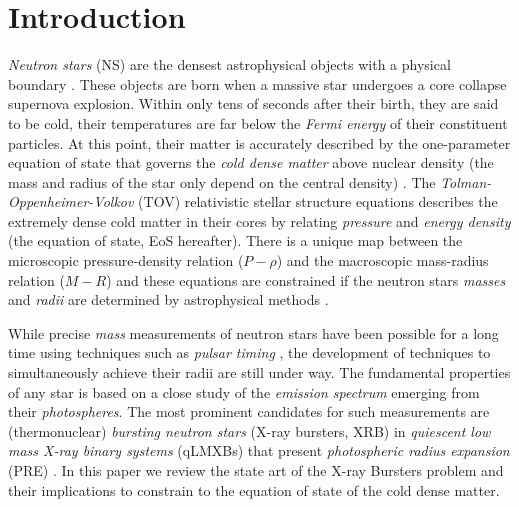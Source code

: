 
\section{Introduction}


{\it Neutron stars} (NS)  are the densest astrophysical objects
with a physical boundary \cite{THORN}. These objects are born when a massive star undergoes a core collapse supernova explosion. Within only tens of seconds after their birth, they are said to be cold, \ie their temperatures are far below the {\it Fermi energy} of their constituent particles. At this point, their matter is accurately described by the one-parameter equation of state that governs the {\it cold dense  matter} above nuclear density (\ie the mass and radius of the star only depend on the central density) \cite{LAT10}.  The {\it Tolman-Oppenheimer-Volkov} (TOV) relativistic stellar structure equations describes the  extremely dense cold matter in their cores by relating {\it pressure} and {\it energy density} (the equation of state, EoS hereafter). There is a unique map between the microscopic pressure-density relation ($P-\rho$) and the macroscopic mass-radius relation ($M-R$) \cite{LIN92} and these equations are constrained if the neutron stars {\it masses} and {\it radii} are determined by astrophysical methods \cite{LM07}. 



\quad

While precise {\it mass} measurements of neutron stars have been possible for a long time using techniques such as {\it pulsar timing} \cite{LO08}, the development of techniques to simultaneously achieve their radii are still under way. The fundamental properties of any star is based on a close study of the {\it emission spectrum} emerging from their {\it photospheres}. The most prominent candidates for such measurements are (thermonuclear) {\it bursting neutron stars} (X-ray bursters, XRB) in {\it quiescent low mass X-ray binary systems} (qLMXBs) that present {\it photospheric radius expansion} (PRE) \cite{LE93}. In this paper we review the state art of the X-ray Bursters problem and their implications to constrain to the equation of state of the cold dense matter.

\quad






